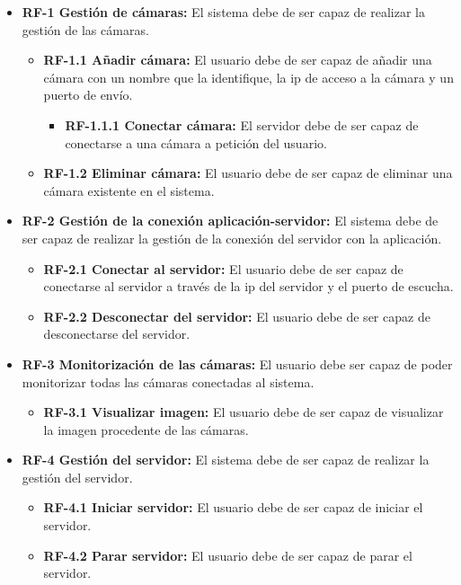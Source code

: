 \begin{itemize}
	\item 
		\textbf{RF-1 Gestión de cámaras:} 
			El sistema debe de ser capaz de realizar la gestión de las cámaras.
		\begin{itemize}
			\item \label{RF1-1}
				\textbf{RF-1.1 Añadir cámara:}
					El usuario debe de ser capaz de añadir una cámara con un nombre que la identifique, la ip de acceso a la cámara y un puerto de envío. 
					\begin{itemize}
						\item
							\textbf{RF-1.1.1 Conectar cámara:}
								El servidor debe de ser capaz de conectarse a una cámara a petición del usuario.
					\end{itemize}
			\item \label{RF1-2}
				\textbf{RF-1.2 Eliminar cámara:}
					El usuario debe de ser capaz de eliminar una cámara existente en el sistema.
		\end{itemize}
		
	\item
		\textbf{RF-2 Gestión de la conexión aplicación-servidor:} 
			El sistema debe de ser capaz de realizar la gestión de la conexión del servidor con la aplicación.
		\begin{itemize}
			\item \label{RF2-1}
				\textbf{RF-2.1 Conectar al servidor:}
					El usuario debe de ser capaz de conectarse al servidor a través de la ip del servidor y el puerto de escucha. 
			\item \label{RF2-2}
				\textbf{RF-2.2 Desconectar del servidor:}
					El usuario debe de ser capaz de desconectarse del servidor.
		\end{itemize}
		
	\item
		\textbf{RF-3 Monitorización de las cámaras:} 
			El usuario debe ser capaz de poder monitorizar todas las cámaras conectadas al sistema.
			\begin{itemize}
			\item \label{RF3-1}
				\textbf{RF-3.1 Visualizar imagen:}
					El usuario debe de ser capaz de visualizar la imagen procedente de las cámaras.
		\end{itemize}
	
	\item
		\textbf{RF-4 Gestión del servidor:} 
			El sistema debe de ser capaz de realizar la gestión del servidor.
		\begin{itemize}
			\item
				\textbf{RF-4.1 Iniciar servidor:}
					El usuario debe de ser capaz de iniciar el servidor.
			\item \label{RF4-2}
				\textbf{RF-4.2 Parar servidor:}
					El usuario debe de ser capaz de parar el servidor.
		\end{itemize}
\end{itemize}



